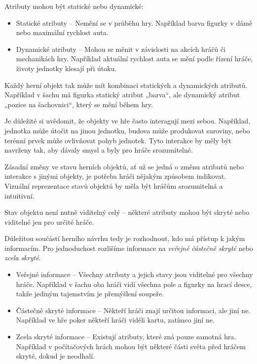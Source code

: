 Atributy mohou být statické nebo dynamické:

\begin{itemize} \item Statické atributy – Nemění se v průběhu hry. Například barva figurky v dámě nebo maximální rychlost auta.
\item Dynamické atributy – Mohou se měnit v závislosti na akcích hráčů či mechanikách hry. Například aktuální rychlost auta se mění podle řízení hráče, životy jednotky klesají při útoku. \end{itemize}

Každý herní objekt tak může mít kombinaci statických a dynamických atributů. Například v šachu má figurka statický atribut „barva“, ale dynamický atribut „pozice na šachovnici“, který se mění během hry.

Je důležité si uvědomit, že objekty ve hře často interagují mezi sebou. Například, jednotka může útočit na jinou jednotku, budova může produkovat suroviny, nebo terénní prvek může ovlivňovat pohyb jednotek. Tyto interakce by měly být navrženy tak, aby dávaly smysl a byly pro hráče srozumitelné.

Zásadní změny ve stavu herních objektů, ať už se jedná o změnu atributů nebo interakce s jinými objekty, je potřeba hráči nějakým způsobem indikovat. Vizuální reprezentace stavů objektů by měla být hráčům srozumitelná a intuitivní.

Stav objektu není nutně viditelný celý – některé atributy mohou být skryté nebo viditelné jen pro určité hráče.

Důležitou součástí herního návrhu tedy je rozhodnout, kdo má přístup k jakým informacím. Pro jednoduchost rozlišíme informace na \textit{veřejné} \textit{částečně skryté} nebo \textit{zcela skryté}. 

\begin{itemize}
    \item Veřejné informace -- Všechny atributy a jejich stavy jsou viditelné pro všechny hráče. Například v šachu oba hráči vidí všechna pole a figurky na hrací desce, takže jediným tajemstvím je přemýšlení soupeře.
    \item Částečně skryté informace -- Někteří hráči znají určitou informaci, ale jiní ne. Například ve hře poker někteří hráči viděli kartu, zatímco jiní ne.
    \item Zcela skryté informace -- Existují atributy, které zná pouze samotná hra. Například v počítačových hrách mohou být některé části světa před hráčem skryté, dokud je neodhalí.
\end{itemize}

